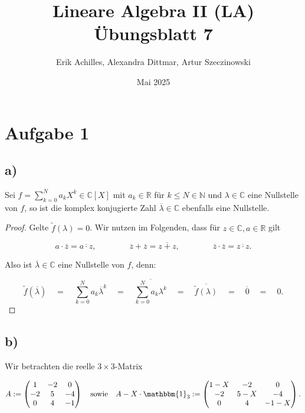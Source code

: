 \documentclass{article}
\title{Lineare Algebra II (LA) Übungsblatt 7}
\author{Erik Achilles, Alexandra Dittmar, Artur Szeczinowski}
\date{Mai 2025}
\newcommand{\NN}{\mathbb{N}}
\newcommand{\RR}{\mathbb{R}}
\newcommand{\CC}{\mathbb{C}}
\newcommand{\eq}{\mathbb{\quad = \quad}}
\begin{document}

\section*{Aufgabe 1}
\subsection*{a)}

Sei $f = \sum_{k=0}^{N}a_kX^k\in \CC[X]$ mit
$a_k \in \RR$ für $k \leq N \in \NN$ und
$\lambda \in \CC$ eine Nullstelle von $f$, so ist die
komplex konjugierte Zahl $\overline{\lambda} \in \CC$
ebenfalls eine Nullstelle.

\begin{proof}
  Gelte $\tilde{f}(\lambda) = 0$.
  Wir nutzen im Folgenden, dass für $z\in\CC,a\in\RR$ gilt

  \[
  a \cdot \overline{z} = \overline{a \cdot z},
  \qquad\qquad
  \overline{z} + \overline{z} = \overline{z + z},
  \qquad\qquad
  \overline{z} \cdot \overline{z} = \overline{z \cdot z}.
  \]

  Also ist $\overline{\lambda} \in \CC$ eine Nullstelle von $f$,
  denn:

  \[
  \tilde{f}(\overline{\lambda})
  \eq
  \sum_{k=0}^{N}a_k \overline{\lambda}^k
  \eq
  \overline{\sum_{k=0}^{N}a_k \lambda^k}
  \eq
  \overline{\tilde{f}(\lambda)}
  \eq
  \overline{0}
  \eq
  0.
  \]
\end{proof}

\subsection*{b)}

Wir betrachten die reelle $3 \times 3$-Matrix

\[
A := 
\begin{pmatrix}
1 & -2 & 0 \\
-2 & 5 & -4 \\
0 & 4 & -1
\end{pmatrix}
\quad \text{sowie} \quad
A - X \cdot \mathbbm{1}_3 := 
\begin{pmatrix}
1 - X & -2 & 0 \\
-2 & 5 - X & -4 \\
0 & 4 & -1 - X
\end{pmatrix}.
\]
\end{document}
